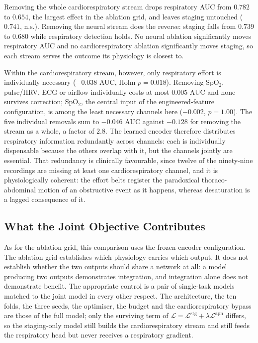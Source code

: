 \documentclass[a4paper,fleqn]{cas-sc}
\newcommand{\fzAcc}{0.739}
\newcommand{\fzAuc}{0.782}
\begin{document}
Removing the whole cardiorespiratory stream drops respiratory AUC from $\fzAuc$ to $0.654$, the largest effect in the ablation grid, and leaves staging untouched ($0.741$, n.s.).
Removing the neural stream does the reverse: staging falls from $\fzAcc$ to $0.680$ while
respiratory detection holds. No neural ablation significantly moves respiratory AUC and no
cardiorespiratory ablation significantly moves staging, so each stream serves the outcome its physiology is closest to.

Within the cardiorespiratory stream, however, only respiratory effort is individually necessary
($-0.038$ AUC, Holm $p=0.018$). Removing SpO$_2$, pulse/HRV, ECG or airflow individually costs at most $0.005$ AUC and none survives correction; SpO$_2$, the central input of the engineered-feature configuration, is among the least necessary channels here ($-0.002$, $p=1.00$). The five
individual removals sum to $-0.046$ AUC against $-0.128$ for removing the stream as a whole,
a factor of $2.8$. The learned encoder therefore distributes respiratory information redundantly across channels: each is individually dispensable because the others overlap with it, but the channels jointly are essential. That redundancy is clinically favourable, since
twelve of the ninety-nine recordings are missing at least one cardiorespiratory channel, and it is
physiologically coherent: the effort belts register the paradoxical thoraco-abdominal motion
of an obstructive event as it happens, whereas desaturation is a lagged consequence of it.

\subsection{What the Joint Objective Contributes}
\label{sec:joint}
As for the ablation grid, this comparison uses the frozen-encoder configuration. The ablation
grid establishes which physiology carries which output. It does not establish
whether the two outputs should share a network at all: a
model producing two outputs demonstrates integration, and integration alone does not
demonstrate benefit. The appropriate control is a pair of single-task models matched to the joint model in every other respect. The architecture, the ten folds, the three seeds, the optimiser, the budget and the cardiorespiratory bypass are those of the full model; only the surviving term of $\mathcal{L}=\mathcal{L}^{\mathrm{stg}}+\lambda\mathcal{L}^{\mathrm{apn}}$ differs, so the staging-only model still builds the cardiorespiratory stream and still feeds the respiratory head but never receives a respiratory gradient.
\end{document}
